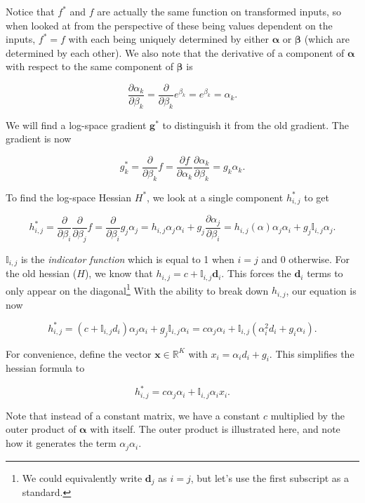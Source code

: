 \documentclass[twoside]{article}
\begin{document}
Notice that $f^*$ and $f$ are actually the same function on transformed inputs, so when looked at from the perspective of these being values dependent on the inputs, $f^* = f$ with each being uniquely determined by either $\boldsymbol{\alpha}$ or $\boldsymbol{\beta}$ (which are determined by each other). We also note that the derivative of a component of $\boldsymbol{\alpha}$ with respect to the same component of $\boldsymbol{\beta}$ is

\[
\frac{\partial {\alpha}_k}{\partial {\beta}_k} = \frac{\partial}{\partial {\beta}_k} e^{\beta_k} = e^{{\beta}_k} = {\alpha}_k.
\]

We will find a log-space gradient $\boldsymbol{g}^*$ to distinguish it from the old gradient. The gradient is now

\[
{g}^*_k = \frac{\partial}{\partial \beta_k} f = \frac{\partial f}{\partial \alpha_k}  \frac{\partial \alpha_k}{\partial \beta_k} = {g}_k \alpha_k.
\]

To find the log-space Hessian $H^*$, we look at a single component $h^*_{i, j}$ to get

\[
{h}^*_{i, j} = \frac{\partial}{\partial \beta_i} \frac{\partial}{\partial \beta_j} f = \frac{\partial}{\partial \beta_i} {g}_j \alpha_j = {h}_{i, j} \alpha_j \alpha_i+ {g}_j \frac{\partial \alpha_j}{\partial \beta_i} = {h}_{i, j}(\alpha) \alpha_j \alpha_i + {g}_j\mathbb{I}_{i,j} \alpha_j.
\]

\(\mathbb{I}_{i,j}\) is the \textit{indicator function} which is equal to 1 when $i = j$ and 0 otherwise. For the old hessian ($H$), we know that $h_{i, j} = c + \mathbb{I}_{i,j} \boldsymbol{d}_i$. This forces the $\boldsymbol{d}_i$ terms to only appear on the diagonal\footnote{We could equivalently write $\boldsymbol{d}_j$ as $i = j$, but let's use the first subscript as a standard.} With the ability to break down $h_{i, j}$, our equation is now

\[
{h}^*_{i, j} = \left(c + \mathbb{I}_{i,j} {d}_i \right) \alpha_j \alpha_i+ {g}_j \mathbb{I}_{i,j} \alpha_i = c \alpha_j \alpha_i + \mathbb{I}_{i,j}\left(\alpha^2_i {d}_i + {g}_i \alpha_i\right).
\]

For convenience, define the vector \(\boldsymbol{x} \in \mathbb{R}^{K}\) with \({x}_i = \alpha_i {d}_i + {g}_i\). This simplifies the hessian formula to

\[
{h}^*_{i, j} = c \alpha_j \alpha_i + \mathbb{I}_{i,j} \alpha_i {x}_i.
\]

Note that instead of a constant matrix, we have a constant $c$ multiplied by the outer product of $\boldsymbol{\alpha}$ with itself. The outer product is illustrated here, and note how it generates the term $\alpha_j \alpha_i$.
\end{document}
